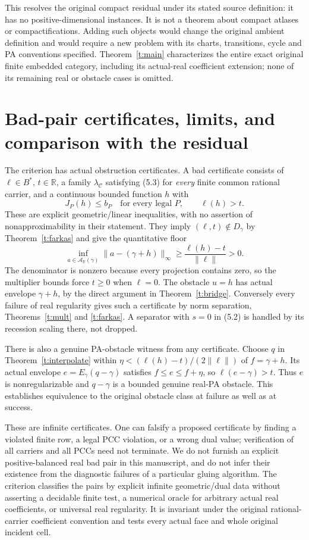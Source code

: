 \documentclass[11pt]{article}
\newcommand{\R}{\mathbb R}\newcommand{\Q}{\mathbb Q}\newcommand{\Z}{\mathbb Z}
\begin{document}
This resolves the original compact residual under its stated source definition: it has no positive-dimensional instances. It is not a theorem about compact atlases or compactifications. Adding such objects would change the original ambient definition and would require a new problem with its charts, transitions, cycle and PA conventions specified. Theorem~\ref{t:main} characterizes the entire exact original finite embedded category, including its actual-real coefficient extension; none of its remaining real or obstacle cases is omitted.

\section{Bad-pair certificates, limits, and comparison with the residual}
The criterion has actual obstruction certificates. A bad certificate consists of $\ell\in B^*$, $t\in\R$, a family $\lambda_\mathcal C$ satisfying (5.3) for \emph{every} finite common rational carrier, and a continuous bounded function $h$ with
\[
 J_P(h)\leq b_P\quad\text{for every legal }P,\qquad
 \ell(h)>t.                                                         \tag{9.1}
\]
These are explicit geometric/linear inequalities, with no assertion of nonapproximability in their statement. They imply $(\ell,t)\notin D_\gamma$ by Theorem~\ref{t:farkas} and give the quantitative floor
\[
 \inf_{a\in\mathcal A_\R(\gamma)}\|a-(\gamma+h)\|_\infty
 \geq \frac{\ell(h)-t}{\|\ell\|}>0.                                 \tag{9.2}
\]
The denominator is nonzero because every projection contains zero, so the multiplier bounds force $t\geq0$ when $\ell=0$. The obstacle $u=h$ has actual envelope $\gamma+h$, by the direct argument in Theorem~\ref{t:bridge}. Conversely every failure of real regularity gives such a certificate by norm separation, Theorems~\ref{t:mult} and \ref{t:farkas}. A separator with $s=0$ in (5.2) is handled by its recession scaling there, not dropped.

There is also a genuine PA-obstacle witness from any certificate. Choose $q$ in Theorem~\ref{t:interpolate} within $\eta<(\ell(h)-t)/(2\|\ell\|)$ of $f=\gamma+h$. Its actual envelope $e=E_\gamma(q-\gamma)$ satisfies $f\leq e\leq f+\eta$, so $\ell(e-\gamma)>t$. Thus $e$ is nonregularizable and $q-\gamma$ is a bounded genuine real-PA obstacle. This establishes equivalence to the original obstacle class at failure as well as at success.

These are infinite certificates. One can falsify a proposed certificate by finding a violated finite row, a legal PCC violation, or a wrong dual value; verification of all carriers and all PCCs need not terminate. We do not furnish an explicit positive-balanced real bad pair in this manuscript, and do not infer their existence from the diagnostic failures of a particular gluing algorithm. The criterion classifies the pairs by explicit infinite geometric/dual data without asserting a decidable finite test, a numerical oracle for arbitrary actual real coefficients, or universal real regularity. It is invariant under the original rational-carrier coefficient convention and tests every actual face and whole original incident cell.
\end{document}
